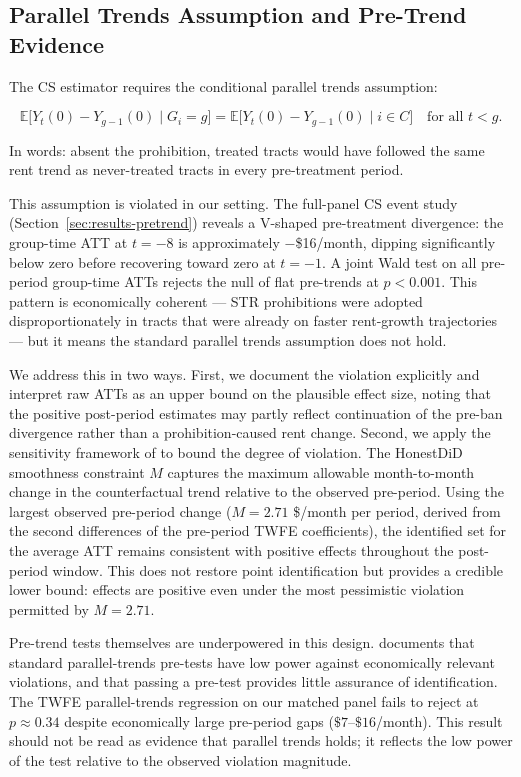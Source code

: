 \subsection{Parallel Trends Assumption and Pre-Trend Evidence}\label{sec:methods-parallel-trends}

The CS estimator requires the conditional parallel trends assumption:

\[
\mathbb{E}\bigl[Y_t(0) - Y_{g-1}(0) \mid G_i = g\bigr] = \mathbb{E}\bigl[Y_t(0) - Y_{g-1}(0) \mid i \in C\bigr] \quad \text{for all } t < g.
\]

In words: absent the prohibition, treated tracts would have followed the same rent trend as never-treated tracts in every pre-treatment period.

This assumption is violated in our setting. The full-panel CS event study (Section~\ref{sec:results-pretrend}) reveals a V-shaped pre-treatment divergence: the group-time ATT at $t = -8$ is approximately $-$\$16/month, dipping significantly below zero before recovering toward zero at $t = -1$. A joint Wald test on all pre-period group-time ATTs rejects the null of flat pre-trends at $p < 0.001$. This pattern is economically coherent --- STR prohibitions were adopted disproportionately in tracts that were already on faster rent-growth trajectories --- but it means the standard parallel trends assumption does not hold.

We address this in two ways. First, we document the violation explicitly and interpret raw ATTs as an upper bound on the plausible effect size, noting that the positive post-period estimates may partly reflect continuation of the pre-ban divergence rather than a prohibition-caused rent change. Second, we apply the sensitivity framework of \citet{rbs2023} to bound the degree of violation. The HonestDiD smoothness constraint $M$ captures the maximum allowable month-to-month change in the counterfactual trend relative to the observed pre-period. Using the largest observed pre-period change ($M = 2.71$ \$/month per period, derived from the second differences of the pre-period TWFE coefficients), the identified set for the average ATT remains consistent with positive effects throughout the post-period window. This does not restore point identification but provides a credible lower bound: effects are positive even under the most pessimistic violation permitted by $M = 2.71$.

Pre-trend tests themselves are underpowered in this design. \citet{roth2022pretest} documents that standard parallel-trends pre-tests have low power against economically relevant violations, and that passing a pre-test provides little assurance of identification. The TWFE parallel-trends regression on our matched panel fails to reject at $p \approx 0.34$ despite economically large pre-period gaps ($\$7$--$\$16$/month). This result should not be read as evidence that parallel trends holds; it reflects the low power of the test relative to the observed violation magnitude.

